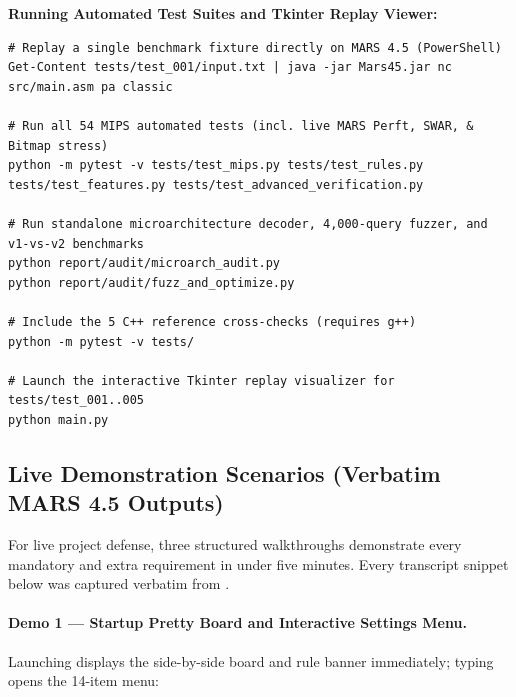 \begin{minipage}{\textwidth}
\textbf{Running Automated Test Suites and Tkinter Replay Viewer:}\par\nopagebreak
\begin{lstlisting}[style=termstyle]
# Replay a single benchmark fixture directly on MARS 4.5 (PowerShell)
Get-Content tests/test_001/input.txt | java -jar Mars45.jar nc src/main.asm pa classic

# Run all 54 MIPS automated tests (incl. live MARS Perft, SWAR, & Bitmap stress)
python -m pytest -v tests/test_mips.py tests/test_rules.py tests/test_features.py tests/test_advanced_verification.py

# Run standalone microarchitecture decoder, 4,000-query fuzzer, and v1-vs-v2 benchmarks
python report/audit/microarch_audit.py
python report/audit/fuzz_and_optimize.py

# Include the 5 C++ reference cross-checks (requires g++)
python -m pytest -v tests/

# Launch the interactive Tkinter replay visualizer for tests/test_001..005
python main.py
\end{lstlisting}
\end{minipage}

\subsection{Live Demonstration Scenarios (Verbatim MARS 4.5 Outputs)}
\label{sec:demo_script}
For live project defense, three structured walkthroughs demonstrate every mandatory and extra requirement in under five minutes. Every transcript snippet below was captured verbatim from .

\paragraph{Demo 1 — Startup Pretty Board and Interactive Settings Menu.}
Launching  displays the side-by-side board and rule banner immediately; typing  opens the 14-item menu:

